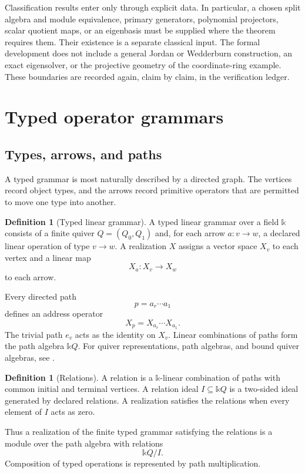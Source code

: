 \documentclass[11pt]{article}
\theoremstyle{definition}
\newtheorem{definition}[theorem]{Definition}
\theoremstyle{remark}
\newcommand{\bbk}{\mathbb{k}}
\begin{document}
Classification results enter only through explicit data. In particular,
a chosen split algebra and module equivalence, primary generators,
polynomial projectors, scalar quotient maps, or an eigenbasis must be supplied
where the theorem requires them. Their existence is a separate classical
input. The formal development does not include a general Jordan or
Wedderburn construction, an exact eigensolver, or the projective geometry
of the coordinate-ring example. These boundaries are recorded again,
claim by claim, in the verification ledger.

\section{Typed operator grammars}

\subsection{Types, arrows, and paths}

A typed grammar is most naturally described by a directed graph. The vertices record object types, and the arrows record primitive operators that are permitted to move one type into another.

\begin{definition}[Typed linear grammar]
A typed linear grammar over a field $\bbk$ consists of a finite quiver $Q=(Q_0,Q_1)$ and, for each arrow $a:v\to w$, a declared linear operation of type $v\to w$. A realization $X$ assigns a vector space $X_v$ to each vertex and a linear map
\[
X_a:X_v\longrightarrow X_w
\]
to each arrow.
\end{definition}

Every directed path
\[
p=a_r\cdots a_1
\]
defines an address operator
\[
X_p=X_{a_r}\cdots X_{a_1}.
\]
The trivial path $e_v$ acts as the identity on $X_v$. Linear combinations of paths form the path algebra $\bbk Q$. For quiver representations, path algebras, and bound quiver algebras, see \cite{assemSimsonSkowronski2006}.

\begin{definition}[Relations]
A relation is a $\bbk$-linear combination of paths with common initial and terminal vertices. A relation ideal $I\subseteq\bbk Q$ is a two-sided ideal generated by declared relations. A realization satisfies the relations when every element of $I$ acts as zero.
\end{definition}

Thus a realization of the finite typed grammar satisfying the relations is a module over the path algebra with relations
\[
\bbk Q/I.
\]
Composition of typed operations is represented by path multiplication.
\end{document}
